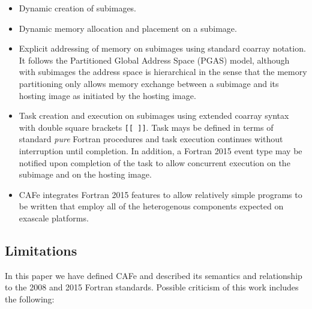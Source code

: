 \begin{itemize}
\item
  Dynamic creation of subimages.
\item
  Dynamic memory allocation and placement on a subimage.
\item
  Explicit addressing of memory on subimages using standard coarray notation.  It follows
  the Partitioned Global Address Space (PGAS) model, although with subimages the address
  space is hierarchical in the sense that the memory partitioning only allows memory exchange
  between a subimage and its hosting image as initiated by the hosting image.
\item
  Task creation and execution on subimages using extended coarray syntax with double
  square brackets \texttt{[[ ]]}.  Task mays be defined in terms of standard \emph{pure}
  Fortran procedures and task execution continues without interruption until completion.
  In addition, a Fortran 2015 event type may be notified upon completion of the task to allow
  concurrent execution on the subimage and on the hosting image.
\item
  CAFe integrates Fortran 2015 features to allow relatively simple programs to be written
  that employ all of the heterogenous components expected on exascale platforms.
\end{itemize}

\subsection{Limitations}

In this paper we have defined CAFe and described its semantics and relationship to the 2008 and
2015 Fortran standards.  Possible criticism of this work includes the following:

